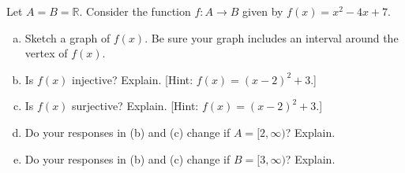 \documentclass[11pt,letterpaper]{article}
\begin{document}
\newpage



 Let $A= B= \mathbb{R}$. Consider the function $f: A \to B$ given by $f(x)= x^2 - 4x + 7$.
	\begin{enumerate}[(a)]
	\item Sketch a graph of $f(x)$. Be sure your graph includes an interval around the vertex of $f(x)$.
	\item Is $f(x)$ injective? Explain. [Hint: $f(x)= (x - 2)^2 + 3$.]
	\item Is $f(x)$ surjective? Explain. [Hint: $f(x)= (x - 2)^2 + 3$.]
	\item Do your responses in (b) and (c) change if $A= [2, \infty)$? Explain. 
	\item Do your responses in (b) and (c) change if $B= [3, \infty)$? Explain. 
	\end{enumerate} \pspace
\end{document}
